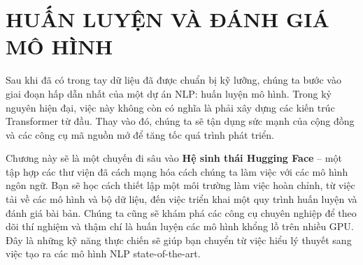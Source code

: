 
\chapter{HUẤN LUYỆN VÀ ĐÁNH GIÁ MÔ HÌNH}
\label{chap:model_training_evaluation}

Sau khi đã có trong tay dữ liệu đã được chuẩn bị kỹ lưỡng, chúng ta bước vào giai đoạn hấp dẫn nhất của một dự án NLP: huấn luyện mô hình. Trong kỷ nguyên hiện đại, việc này không còn có nghĩa là phải xây dựng các kiến trúc Transformer từ đầu. Thay vào đó, chúng ta sẽ tận dụng sức mạnh của cộng đồng và các công cụ mã nguồn mở để tăng tốc quá trình phát triển.

Chương này sẽ là một chuyến đi sâu vào \textbf{Hệ sinh thái Hugging Face} -- một tập hợp các thư viện đã cách mạng hóa cách chúng ta làm việc với các mô hình ngôn ngữ. Bạn sẽ học cách thiết lập một môi trường làm việc hoàn chỉnh, từ việc tải về các mô hình và bộ dữ liệu, đến việc triển khai một quy trình huấn luyện và đánh giá bài bản. Chúng ta cũng sẽ khám phá các công cụ chuyên nghiệp để theo dõi thí nghiệm và thậm chí là huấn luyện các mô hình khổng lồ trên nhiều GPU. Đây là những kỹ năng thực chiến sẽ giúp bạn chuyển từ việc hiểu lý thuyết sang việc tạo ra các mô hình NLP state-of-the-art.